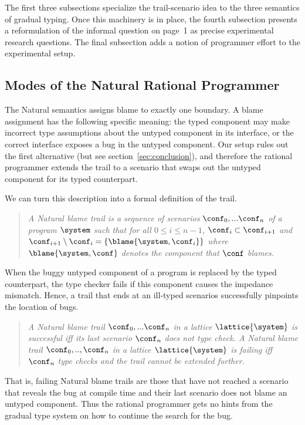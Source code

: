 
The first three subsections specialize the trail-scenario idea to the
three semantics of gradual typing. Once this machinery is in place,
the fourth subsection presents a reformulation of the informal
question on page~1 as precise experimental research questions. The
final subsection adds a notion of programmer effort to the
experimental setup. 


\subsection{Modes of the Natural Rational Programmer} \label{sub:natural}

The Natural semantics assigns blame to exactly one boundary.  A blame assignment
has the following specific meaning: the typed component may make incorrect type
assumptions about the untyped component in its interface, or the correct
interface exposes a bug in the untyped component. Our setup rules out the first
alternative (but see section~\ref{sec:conclusion}), and therefore the rational
programmer extends the trail to a scenario that swaps out the untyped component
for its typed counterpart.

We can turn this description into a formal definition of the trail. 
\begin{quote}
\it A \emph{Natural blame trail} is a sequence of scenarios $\conf_0,...\conf_n$ of
a program $\system$ such that for all $0 \leq i \leq n - 1$, $\conf_i \subset
\conf_{i+1}$ and $\conf_{i+1} \setminus \conf_i =\{\blame{\system, \conf_i}\}$ where
$\blame{\system, \conf}$ denotes the component that $\conf$ blames.
\end{quote}

When the buggy untyped component of a program is replaced by the typed counterpart,
the type checker fails if this component causes the impedance mismatch. Hence, a
trail that ends at an ill-typed scenarios successfully pinpoints the location of
bugs. 
\begin{quote}
\it A Natural blame trail $\conf_0,...\conf_n$ in a lattice $\lattice{\system}$ is
\emph{successful} iff its last scenario $\conf_n$ does not type check.  A Natural
blame trail $\conf_0,..,\conf_n$ in a lattice $\lattice{\system}$ is \emph{failing}
iff $\conf_n$ type checks and the trail cannot be extended further.
\end{quote}
That is, failing Natural blame trails are those that have not reached a scenario that
reveals the bug at compile time and their last scenario does not blame an untyped component. Thus
the rational programmer gets no hints from the gradual type system on how to
continue the search for the bug.

